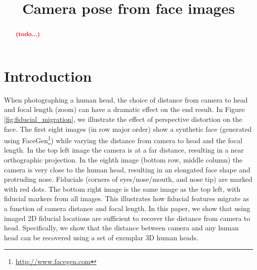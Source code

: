 \documentclass[runningheads]{llncs}
\newcommand {\afbnote} [1] {{\bf \textcolor{red}{(#1)}}}
\begin{document}
\pagestyle{headings}

\mainmatter

\title{Camera pose from face images}


\maketitle

\begin{abstract}
\afbnote{todo...}
\end{abstract}

\section{Introduction}
When photographing a human head, the choice of distance from camera to head and focal length (zoom) can have a dramatic effect on the end result.  
In Figure \ref{fig:fiducial_migration}, we illustrate the effect of perspective distortion on the face. 
The first eight images (in row major order) show a synthetic face (generated using FaceGen\footnote{\url{http://www.facegen.com}}) while varying the distance from camera to head and the focal length.  
In the top left image the camera is at a far distance, resulting in a near orthographic projection.  
In the eighth image (bottom row, middle column) the camera is very close to the human head, resulting in an elongated face shape and protruding nose.  
Fiducials (corners of eyes/nose/mouth, and nose tip) are marked with red dots.  
The bottom right image is the same image as the top left, with fiducial markers from all images.
This illustrates how fiducial features migrate as a function of camera distance and focal length. 
In this paper, we show that using imaged 2D fiducial locations are sufficient to recover the distance from camera to head. 
Specifically, we show that the distance between camera and any human head can be recovered using a set of exemplar 3D human heads.
\end{document}
